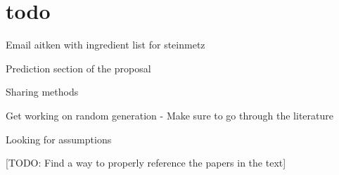 \documentclass[12pt]{article}
\begin{document}

\section{todo}
Email aitken with ingredient list for steinmetz

Prediction section of the proposal

Sharing methods

Get working on random generation
 - Make sure to go through the literature

Looking for assumptions


\printglossary[type=\acronymtype,title=Abbreviations]






{\tiny [TODO: Find a way to properly reference the papers in the text] }
\end{document}
